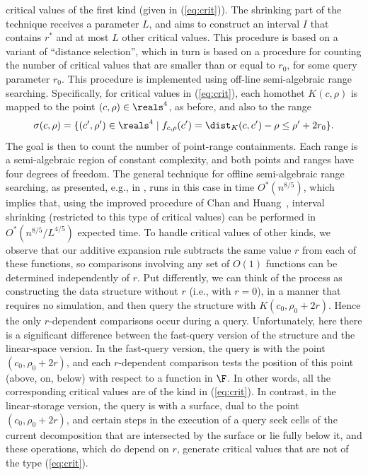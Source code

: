 critical values of the first kind (given in (\ref{eq:crit})). 
%
The shrinking part of the technique receives a parameter $L$, and aims to construct an interval $I$
that contains $r^*$ and at most $L$ other critical values. This procedure is based on a variant 
of ``distance selection'', which in turn is based on a procedure for counting the number of 
critical values that are smaller than or equal to $r_0$, for some query parameter $r_0$. 
This procedure is implemented using off-line semi-algebraic range searching. 
Specifically, for critical values in (\ref{eq:crit}), each homothet
$K(c,\rho)$ is mapped to the point $(c,\rho)\in\reals^4$, as before, and also to the range
\[
\sigma(c,\rho) = \{ (c',\rho') \in\reals^4 \mid f_{c,\rho}(c') = \dist_K(c,c') - \rho \le \rho' + 2r_0 \} .
\]
The goal is then to count the number of point-range containments. Each range is a semi-algebraic region
of constant complexity, and both points and ranges have four degrees of freedom. The general technique
for offline semi-algebraic range searching, as presented, e.g., in \cite[Appendix]{AAEKS}, runs in
this case in time $O^*(n^{8/5})$, which implies that, using the improved procedure 
of Chan and Huang~\cite{CH}, interval shrinking (restricted to this type of critical values)
can be performed in $O^*(n^{8/5}/L^{4/5})$ expected time.
%
To handle critical values of other kinds, we observe that our additive expansion rule
subtracts the same value $r$ from each of these functions, so comparisons involving any 
set of $O(1)$ functions can be determined independently of $r$. Put differently, we can
think of the process as constructing the data structure without $r$ (i.e., with $r=0$),
in a manner that requires no simulation, and then query the structure with $K(c_0,\rho_0+2r)$.
Hence the only $r$-dependent comparisons occur during a query.
%
Unfortunately, here there is a significant difference between the fast-query version of
the structure and the linear-space version. In the fast-query version, the query is with 
the point $(c_0,\rho_0+2r)$, and each $r$-dependent comparison tests the position of this point
(above, on, below) with respect to a function in $\F$. In other words, all the corresponding
critical values are of the kind in (\ref{eq:crit}). In contrast, in the linear-storage version, 
the query is with a surface, dual to the point $(c_0,\rho_0+2r)$, and certain steps in the 
execution of a query seek cells of the current decomposition that are intersected
by the surface or lie fully below it, and these operations, which do depend on $r$, generate
critical values that are not of the type (\ref{eq:crit}).

